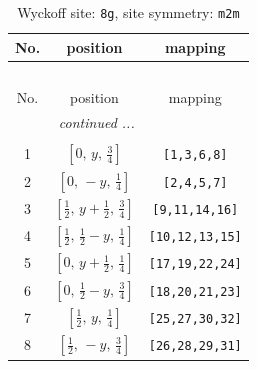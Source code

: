 \documentclass[fleqn,8pt]{jsarticle}
\begin{document}
\begin{longtable}{ccc}
\caption{Wyckoff site: {\tt 8g}, site symmetry: {\tt m2m}}
 \\
 \hline \hline
No. & position & mapping \\ \hline \endfirsthead

\multicolumn{2}{l}{\tablename\ \thetable{}} \\
 \hline \hline
No. & position & mapping \\ \hline \endhead

 \hline \hline
\multicolumn{2}{r}{\footnotesize\it continued ...} \\ \endfoot

 \hline \hline
\multicolumn{2}{r}{} \\ \endlastfoot

1 & $\left[ 0,\, y,\, \frac{3}{4} \right]$ & {\tt [1,3,6,8]} \\ \hline
2 & $\left[ 0,\, - y,\, \frac{1}{4} \right]$ & {\tt [2,4,5,7]} \\ \hline
3 & $\left[ \frac{1}{2},\, y + \frac{1}{2},\, \frac{3}{4} \right]$ & {\tt [9,11,14,16]} \\ \hline
4 & $\left[ \frac{1}{2},\, \frac{1}{2} - y,\, \frac{1}{4} \right]$ & {\tt [10,12,13,15]} \\ \hline
5 & $\left[ 0,\, y + \frac{1}{2},\, \frac{1}{4} \right]$ & {\tt [17,19,22,24]} \\ \hline
6 & $\left[ 0,\, \frac{1}{2} - y,\, \frac{3}{4} \right]$ & {\tt [18,20,21,23]} \\ \hline
7 & $\left[ \frac{1}{2},\, y,\, \frac{1}{4} \right]$ & {\tt [25,27,30,32]} \\ \hline
8 & $\left[ \frac{1}{2},\, - y,\, \frac{3}{4} \right]$ & {\tt [26,28,29,31]} \\
\end{longtable}
\renewcommand{\arraystretch}{1.2}
\end{document}
